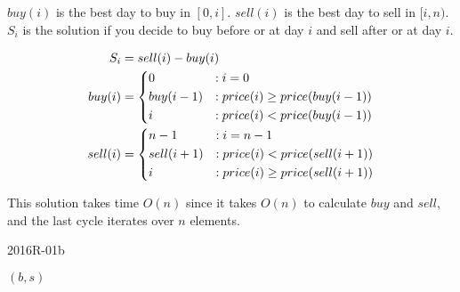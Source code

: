 \documentclass{cal}
\begin{document}
{\ansseparator

$buy(i)$ is the best day to buy in $[0,i]$. $sell(i)$ is the best day to sell in $[i,n)$. $S_i$ is the solution if you decide to buy before or at day $i$ and sell after or at day $i$.

\begin{alignat*}{2}
    S_i     &= sell(i) - buy(i) \\
    buy(i)  &= \begin{dcases}
        0                          &: i=0 \\
        buy(i-1) &: price(i) \geq price(buy(i-1)) \\
        i        &: price(i) <    price(buy(i-1))
    \end{dcases} \\
    sell(i) &= \begin{dcases}
        n-1                         &: i=n-1 \\
        sell(i+1) &: price(i) <    price(sell(i+1)) \\
        i         &: price(i) \geq price(sell(i+1))
    \end{dcases}
\end{alignat*}

This solution takes time $O(n)$ since it takes $O(n)$ to calculate $buy$ and $sell$, and the last cycle iterates over $n$ elements.

\newpage
\begin{algorithm}[H]
    \caption{2016R-01b}
    \begin{algorithmic}[1]
                \EndIf
            \EndFor
                \EndIf
            \EndFor
                \EndIf
            \EndFor
            \State \Return $(b, s)$
        \EndFunction
    \end{algorithmic}
\end{algorithm}

}
\end{document}
